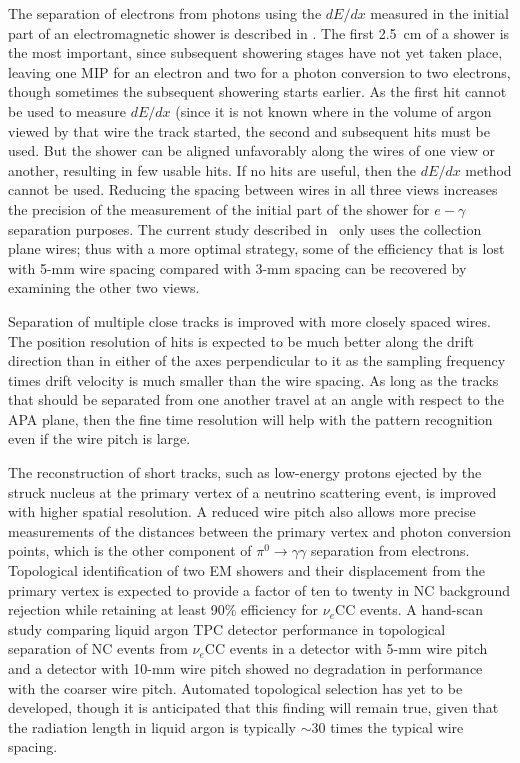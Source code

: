 The separation of electrons from photons using the $dE/dx$ measured in
the initial part of an electromagnetic shower is described in
\anxreco.  The first 2.5~cm of a shower is the most important, since 
subsequent showering stages have not yet taken place, leaving one MIP
for an electron and two for a photon conversion to two electrons,
though sometimes the subsequent showering starts earlier.  As the
first hit cannot be used to measure $dE/dx$ (since it is not known
where in the volume of argon viewed by that wire the track started,
the second and subsequent hits must be used.  But the shower can be
aligned unfavorably along the wires of one view or another, resulting
in few usable hits.  If no hits are useful, then the $dE/dx$ method
cannot be used.  Reducing the spacing between wires in all three views
increases the precision of the measurement of the initial part of the
shower for $e-\gamma$ separation purposes.  The current study
described in \anxreco\ only uses the collection plane wires; 
thus with a more optimal strategy, some of the efficiency that is lost
with 5-mm wire spacing compared with 3-mm spacing can be recovered by
examining the other two views.

Separation of multiple close tracks is improved with more closely
spaced wires.  The position resolution of hits is expected to be much
better along the drift direction than in either of the axes
perpendicular to it as the sampling frequency times drift velocity is
much smaller than the wire spacing.  As long as the tracks that should
be separated from one another travel at an angle with respect to the
APA plane, then the fine time resolution will help with the pattern
recognition even if the wire pitch is large.

The reconstruction of short tracks, such as low-energy protons ejected
by the struck nucleus at the primary vertex of a neutrino scattering
event, is improved with higher spatial resolution.  A reduced wire pitch also
allows more precise measurements of the distances between the
primary vertex and photon conversion points, which is the other
component of $\pi^0\rightarrow\gamma\gamma$ separation from electrons.
Topological identification of two EM showers and their displacement
from the primary vertex is expected to provide a factor of ten to
twenty in NC background rejection while retaining at least 90\%
efficiency for $\nu_e$CC events.  A hand-scan study comparing liquid
argon TPC detector performance in topological separation of NC events
from $\nu_e$CC events in a detector with 5-mm wire pitch and a
detector with 10-mm wire pitch\cite{2008-hand-scan} showed no
degradation in performance with the coarser wire pitch.  Automated
topological selection has yet to be developed, though it is
anticipated that this finding will remain true, given that the
radiation length in liquid argon is typically $\sim$30 times the
typical wire spacing.

